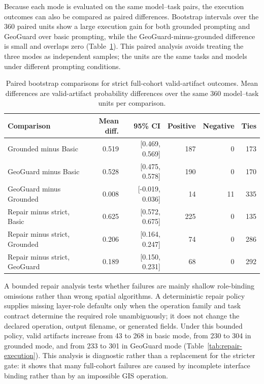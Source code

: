 \documentclass[12pt]{gsis}  %
\begin{document}
Because each mode is evaluated on the same model--task pairs, the execution outcomes can also be compared as paired differences. Bootstrap intervals over the 360 paired units show a large execution gain for both grounded prompting and GeoGuard over basic prompting, while the GeoGuard-minus-grounded difference is small and overlaps zero (Table~\ref{tab:paired-execution-comparisons}). This paired analysis avoids treating the three modes as independent samples; the units are the same tasks and models under different prompting conditions.

\begin{table}[htbp]
\centering
\caption{Paired bootstrap comparisons for strict full-cohort valid-artifact outcomes. Mean differences are valid-artifact probability differences over the same 360 model--task units per comparison.}
\label{tab:paired-execution-comparisons}
\small
\setlength{\tabcolsep}{3pt}
\begin{tabular}{lrrrrr}
\toprule
Comparison & Mean diff. & 95\% CI & Positive & Negative & Ties \\
\midrule
Grounded minus Basic & 0.519 & [0.469, 0.569] & 187 & 0 & 173 \\
GeoGuard minus Basic & 0.528 & [0.475, 0.578] & 190 & 0 & 170 \\
GeoGuard minus Grounded & 0.008 & [-0.019, 0.036] & 14 & 11 & 335 \\
Repair minus strict, Basic & 0.625 & [0.572, 0.675] & 225 & 0 & 135 \\
Repair minus strict, Grounded & 0.206 & [0.164, 0.247] & 74 & 0 & 286 \\
Repair minus strict, GeoGuard & 0.189 & [0.150, 0.231] & 68 & 0 & 292 \\
\bottomrule
\end{tabular}
\end{table}

A bounded repair analysis tests whether failures are mainly shallow role-binding omissions rather than wrong spatial algorithms. A deterministic repair policy supplies missing layer-role defaults only when the operation family and task contract determine the required role unambiguously; it does not change the declared operation, output filename, or generated fields. Under this bounded policy, valid artifacts increase from 43 to 268 in basic mode, from 230 to 304 in grounded mode, and from 233 to 301 in GeoGuard mode (Table~\ref{tab:repair-execution}). This analysis is diagnostic rather than a replacement for the stricter gate: it shows that many full-cohort failures are caused by incomplete interface binding rather than by an impossible GIS operation.
\end{document}
